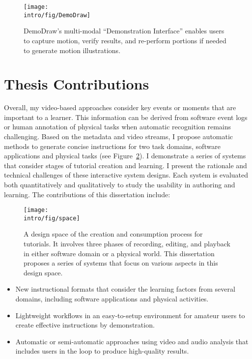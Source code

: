 \begin{figure}[t]
  \centering
  \texttt{[image: \\intro/fig/DemoDraw]}
  \caption{DemoDraw's multi-modal ``Demonstration Interface'' enables users  to capture motion, verify results, and re-perform portions if needed to generate motion illustrations.}
  \label{fig:demodraw_intro}
\end{figure}


\section{Thesis Contributions}

Overall, my video-based approaches consider key events or moments that are important to a learner. This information can be derived from software event logs or human annotation of physical tasks when automatic recognition remains challenging. Based on the metadata and video streams, I propose automatic methods to generate concise instructions for two task domains, software applications and physical tasks (see Figure~\ref{fig:space}). I demonstrate a series of systems that consider stages of tutorial creation and learning.
%
I present the rationale and technical challenges of these interactive system designs. Each system is evaluated both quantitatively and qualitatively to study the usability in authoring and learning. The contributions of this dissertation include:

\begin{figure}[t]
  \centering
  \texttt{[image: \\intro/fig/space]}
  \caption{A design space of the creation and consumption process for tutorials. It involves three phases of recording, editing, and playback in either software domain or a physical world. This dissertation proposes a series of systems that focus on various aspects in this design space.}
  \label{fig:space}
\end{figure}

\begin{itemize}
  \setlength{\itemsep}{0pt}
\item New instructional formats that consider the learning factors from several domains, including software applications and physical activities.
\item Lightweight workflows in an easy-to-setup environment for amateur users to create effective instructions by demonstration.
\item Automatic or semi-automatic approaches using video and audio analysis that includes users in the loop to produce high-quality results.
\end{itemize}

